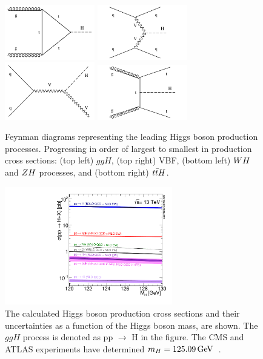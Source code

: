\begin{figure}[htbp]
\centering
     \includegraphics[width=0.35\textwidth]{phenomenology_of_processes/plots/feyn_ggH.pdf}
     \includegraphics[width=0.35\textwidth]{phenomenology_of_processes/plots/feyn_qqH.pdf}
     \includegraphics[width=0.35\textwidth]{phenomenology_of_processes/plots/feyn_VH.pdf}
     \includegraphics[width=0.35\textwidth]{phenomenology_of_processes/plots/feyn_ttH.pdf}
     \caption{
Feynman diagrams representing the leading Higgs boson production processes.
Progressing in order of largest to smallest in production cross sections:
(top left) $ggH$, (top right) VBF, (bottom left)
$WH$ and $ZH$ processes,
and (bottom right) $t\bar{t}H$.
     }
     \label{fig:higgs_feyn}
\end{figure}


\begin{figure}[htbp]
\centering
     \includegraphics[width=0.65\textwidth]{phenomenology_of_processes/plots/plot_13tev_H_sqrt.pdf}
     \caption{
The calculated Higgs boson production cross sections and their uncertainties
as a function of the Higgs boson mass, are shown. The $ggH$ process
is denoted as pp $\to$ H in the figure.
The CMS and ATLAS experiments have determined $m_{H} = 125.09\,\mathrm{GeV}$~\cite{Aad:2015zhl}.
     }
     \label{fig:higgs_production}
\end{figure}


